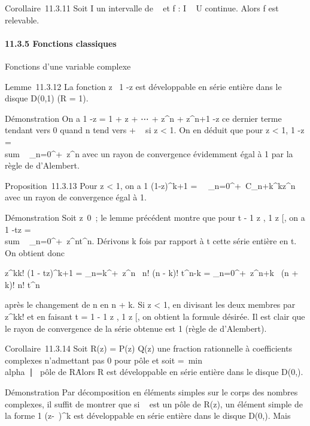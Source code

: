 \documentclass[]{article}
\begin{document}
Corollaire~11.3.11 Soit I un intervalle de ~ et f : I \rightarrow~ U continue.
Alors f est relevable.

\paragraph{11.3.5 Fonctions classiques}

Fonctions d'une variable complexe

Lemme~11.3.12 La fonction z\mapsto~ 1
-z est développable en série entière dans le
disque D(0,1) (R = 1).

Démonstration On a  1 -z = 1 + z +
⋯ + z^n + z^n+1
-z ce dernier terme tendant vers 0 quand n tend
vers + \infty~ si z \textless{} 1. On en déduit que pour
z \textless{} 1,  1 -z
= \\sum ~
_n=0^+\infty~z^n avec un rayon de convergence
évidemment égal à 1 par la règle de d'Alembert.

Proposition~11.3.13 Pour z \textless{} 1, on a  1
\over (1-z)^k+1 =\
\sum ~
_n=0^+\infty~C_n+k^kz^n avec un rayon
de convergence égal à 1.

Démonstration Soit z\neq~0~; le lemme précédent
montre que pour t \in{]} - 1 \over
z , 1 \over
z {[}, on a  1 -tz
= \\sum ~
_n=0^+\infty~z^nt^n. Dérivons k fois par
rapport à t cette série entière en t. On obtient donc

 z^kk! \over (1 - tz)^k+1 =
\sum _n=k^+\infty~z^n~ n!
\over (n - k)! t^n-k =
\sum _n=0^+\infty~z^n+k~ (n +
k)! \over n! t^n

après le changement de n en n + k. Si z \textless{}
1, en divisant les deux membres par z^kk! et en faisant t = 1
\in{]} - 1 \over z , 1
\over z {[}, on obtient la formule
désirée. Il est clair que le rayon de convergence de la série obtenue
est 1 (règle de d'Alembert).

Corollaire~11.3.14 Soit R(z) = P(z) \over Q(z) une
fraction rationnelle à coefficients complexes n'admettant pas 0 pour
pôle et soit \rho =\
min\\alpha~∣\alpha~\text
pôle de R\. Alors R est développable en série entière
dans le disque D(0,\rho).

Démonstration Par décomposition en éléments simples sur le corps des
nombres complexes, il suffit de montrer que si \alpha~ est un pôle de R(z), un
élément simple de la forme  1 \over
(z-\alpha~)^k est développable en série entière dans le disque
D(0,\rho). Mais
\end{document}

